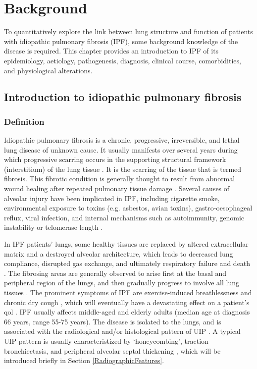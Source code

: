 \chapter{Background} \label{Yuwen_Background}
To quantitatively explore the link between lung structure and function of patients with idiopathic pulmonary fibrosis (IPF), some background knowledge of the disease is required. This chapter provides an introduction to IPF of its epidemiology, aetiology, pathogenesis, diagnosis, clinical course, comorbidities, and physiological alterations.

\section{Introduction to idiopathic pulmonary fibrosis} 
\subsection{Definition} 
Idiopathic pulmonary fibrosis is a chronic, progressive, irreversible, and lethal lung disease of unknown cause. It usually manifests over several years during which progressive scarring occurs in the supporting structural framework (interstitium) of the lung tissue \citep{meltzer2008idiopathic, raghu2011official}. It is the scarring of the tissue that is termed fibrosis. This fibrotic condition is generally thought to result from abnormal wound healing after repeated pulmonary tissue damage \citep{king2011idiopathic}. Several causes of alveolar injury have been implicated in IPF, including cigarette smoke, environmental exposure to toxins (e.g. asbestos, avian toxins), gastro-oesophageal reflux, viral infection, and internal mechanisms such as autoimmunity, genomic instability or telomerase length \citep{raghu2011official, ahluwalia2014new}.

In IPF patients' lungs, some healthy tissues are replaced by altered extracellular matrix and a destroyed alveolar architecture, which leads to decreased lung compliance, disrupted gas exchange, and ultimately respiratory failure and death \citep{richeldi2017idiopathic}. The fibrosing areas are generally observed to arise first at the basal and peripheral region of the lungs, and then gradually progress to involve all lung tissues \citep{martinez2017idiopathic}. The prominent symptoms of IPF are exercise-induced breathlessness and chronic dry cough \citep{meltzer2008idiopathic}, which will eventually have a devastating effect on a patient’s \gls{qol} \citep{kim2015natural}. IPF usually affects middle-aged and elderly adults (median age at diagnosis 66 years, range 55-75 years). The disease is isolated to the lungs, and is associated with the radiological and/or histological pattern of UIP \citep{king2011idiopathic,raghu2011official,xaubet2017idiopathic}. A typical UIP pattern is usually characteristized by ‘honeycombing’, traction bronchiectasis, and peripheral alveolar septal thickening \citep{martinez2017idiopathic}, which will be introduced briefly in Section \ref{RadiographicFeatures}.

